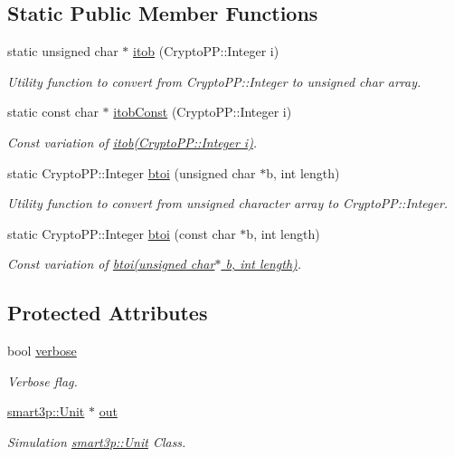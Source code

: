 \subsection*{Static Public Member Functions}
\begin{DoxyCompactItemize}
\item 
static unsigned char $\ast$ \hyperlink{classAdapter_ae68c18841f3a26166d58e5771726a90e}{itob} (Crypto\+P\+P\+::\+Integer i)
\begin{DoxyCompactList}\small\item\em Utility function to convert from Crypto\+P\+P\+::\+Integer to unsigned char array. \end{DoxyCompactList}\item 
static const char $\ast$ \hyperlink{classAdapter_a670343c730c9d4b08cc98b5b58a65988}{itob\+Const} (Crypto\+P\+P\+::\+Integer i)
\begin{DoxyCompactList}\small\item\em Const variation of \hyperlink{classAdapter_ae68c18841f3a26166d58e5771726a90e}{itob(\+Crypto\+P\+P\+::\+Integer i)}. \end{DoxyCompactList}\item 
static Crypto\+P\+P\+::\+Integer \hyperlink{classAdapter_ac816b07d03c876f535286cd757a0995b}{btoi} (unsigned char $\ast$b, int length)
\begin{DoxyCompactList}\small\item\em Utility function to convert from unsigned character array to Crypto\+P\+P\+::\+Integer. \end{DoxyCompactList}\item 
static Crypto\+P\+P\+::\+Integer \hyperlink{classAdapter_aafe53d6cbf771b802c76236c05df1616}{btoi} (const char $\ast$b, int length)
\begin{DoxyCompactList}\small\item\em Const variation of \hyperlink{classAdapter_ac816b07d03c876f535286cd757a0995b}{btoi(unsigned char$\ast$ b, int length)}. \end{DoxyCompactList}\end{DoxyCompactItemize}
\subsection*{Protected Attributes}
\begin{DoxyCompactItemize}
\item 
bool \hyperlink{classAdapter_a49cad2fc1742424ec9f28caaa30f489f}{verbose}
\begin{DoxyCompactList}\small\item\em Verbose flag. \end{DoxyCompactList}\item 
\hyperlink{classsmart3p_1_1Unit}{smart3p\+::\+Unit} $\ast$ \hyperlink{classAdapter_abdeff6c9fdf71ac88a56318fa7aea4c4}{out}
\begin{DoxyCompactList}\small\item\em Simulation \hyperlink{classsmart3p_1_1Unit}{smart3p\+::\+Unit} Class. \end{DoxyCompactList}\end{DoxyCompactItemize}



